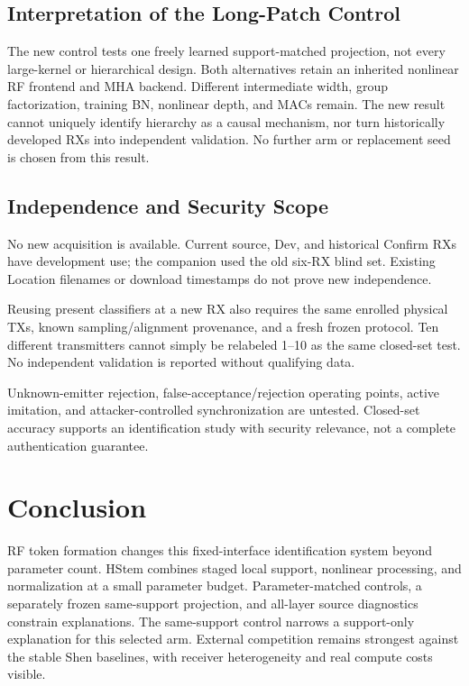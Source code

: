 \documentclass[journal]{IEEEtran}
\begin{document}
\subsection{Interpretation of the Long-Patch Control}
The new control tests one freely learned support-matched projection, not every large-kernel or hierarchical design. Both alternatives retain an inherited nonlinear RF frontend and MHA backend. Different intermediate width, group factorization, training BN, nonlinear depth, and MACs remain. The new result cannot uniquely identify hierarchy as a causal mechanism, nor turn historically developed RXs into independent validation. No further arm or replacement seed is chosen from this result.

\subsection{Independence and Security Scope}
No new acquisition is available. Current source, Dev, and historical Confirm RXs have development use; the companion used the old six-RX blind set. Existing Location filenames or download timestamps do not prove new independence.

Reusing present classifiers at a new RX also requires the same enrolled physical TXs, known sampling/alignment provenance, and a fresh frozen protocol. Ten different transmitters cannot simply be relabeled 1--10 as the same closed-set test. No independent validation is reported without qualifying data.

Unknown-emitter rejection, false-acceptance/rejection operating points, active imitation, and attacker-controlled synchronization are untested. Closed-set accuracy supports an identification study with security relevance, not a complete authentication guarantee.

\section{Conclusion}
RF token formation changes this fixed-interface identification system beyond parameter count. HStem combines staged local support, nonlinear processing, and normalization at a small parameter budget. Parameter-matched controls, a separately frozen same-support projection, and all-layer source diagnostics constrain explanations. The same-support control narrows a support-only explanation for this selected arm. External competition remains strongest against the stable Shen baselines, with receiver heterogeneity and real compute costs visible.
\end{document}
